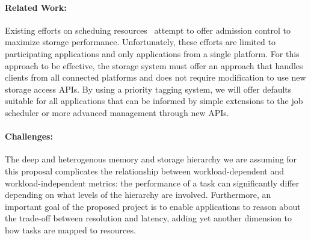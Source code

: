 \paragraph{Related Work:} Existing efforts on scheduing resources~\cite{io-cop,dorier} attempt to offer
admission control to maximize storage performance. Unfortunately, these efforts
are limited to participating applications and only applications from a single
platform. For this approach to be effective, the storage system must offer an
approach that handles clients from all connected platforms and does not
require modification to use new storage access APIs. By using a priority
tagging system, we will offer defaults suitable for all applications that can
be informed by simple extensions to the job scheduler or more advanced
management through new APIs.

\paragraph{Challenges:} The deep and heterogenous memory and storage
hierarchy we are assuming for this proposal complicates the
relationship between workload-dependent and workload-independent
metrics: the performance of a task can significantly differ depending
on what levels of the hierarchy are involved. Furthermore, an
important goal of the proposed project is to enable applications
to reason about the trade-off between resolution and latency, adding
yet another dimension to how tasks are mapped to resources.

